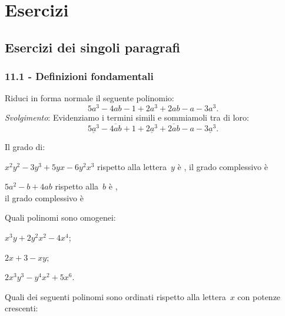\section{Esercizi}
\subsection{Esercizi dei singoli paragrafi}
\subsubsection*{11.1 - Definizioni fondamentali}
\begin{multicols}{2}
\begin{esercizio}
\label{ese:11.1}
Riduci in forma normale il seguente polinomio:
\[5a^3-4ab-1+2a^3+2ab-a-3a^3.\]
\emph{Svolgimento}: Evidenziamo i termini simili e sommiamoli tra di loro:
\[\underline{5a^3}-\overline{4ab}+1+\underline{2a^3}+\overline{2ab}-a-\underline{3a^3}.\]
\end{esercizio}

\begin{esercizio}
\label{ese:11.2}
Il grado di:
\begin{enumeratea}
\item $x^2y^2−3y^3+5yx−6y^2x^3$ rispetto alla lettera~$y$ è \dotfill, il grado complessivo è \dotfill
\item $5a^2−b+4ab$ rispetto alla~$b$ è \dotfill,\\ il grado complessivo è \dotfill
\end{enumeratea}
\end{esercizio}


\begin{esercizio}
\label{ese:11.3}
Quali polinomi sono omogenei:
\begin{enumeratea}
\item $x^3y+2y^2x^2−4x^4$;
\item $2x+3−xy$;
\item $2x^3y^3−y^4x^2+5x^6$.
\end{enumeratea}
\end{esercizio}

\begin{esercizio}
\label{ese:11.4}
Quali dei seguenti polinomi sono ordinati rispetto alla lettera~$x$ con potenze crescenti:


\end{esercizio}
\end{multicols}
